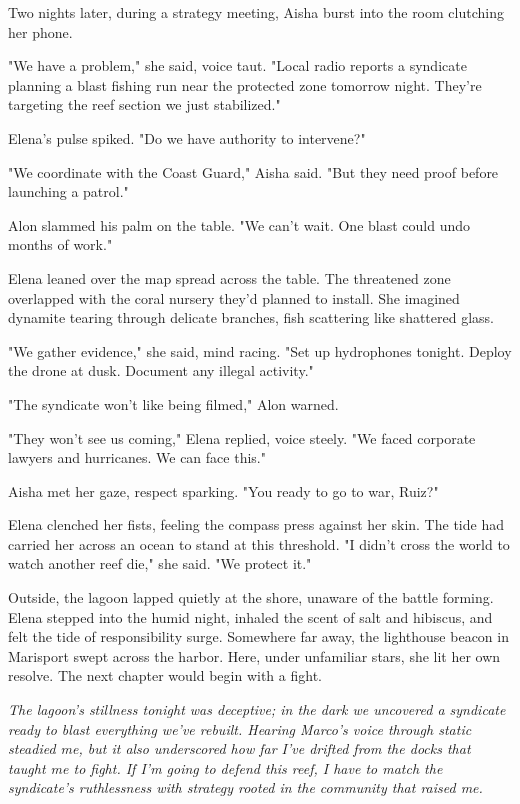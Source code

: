 \bigskip

Two nights later, during a strategy meeting, Aisha burst into the room clutching her phone.

"We have a problem," she said, voice taut. "Local radio reports a syndicate planning a blast fishing run near the protected zone tomorrow night. They're targeting the reef section we just stabilized."

Elena's pulse spiked. "Do we have authority to intervene?"

"We coordinate with the Coast Guard," Aisha said. "But they need proof before launching a patrol."

Alon slammed his palm on the table. "We can't wait. One blast could undo months of work."

Elena leaned over the map spread across the table. The threatened zone overlapped with the coral nursery they'd planned to install. She imagined dynamite tearing through delicate branches, fish scattering like shattered glass.

"We gather evidence," she said, mind racing. "Set up hydrophones tonight. Deploy the drone at dusk. Document any illegal activity."

"The syndicate won't like being filmed," Alon warned.

"They won't see us coming," Elena replied, voice steely. "We faced corporate lawyers and hurricanes. We can face this."

Aisha met her gaze, respect sparking. "You ready to go to war, Ruiz?"

Elena clenched her fists, feeling the compass press against her skin. The tide had carried her across an ocean to stand at this threshold. "I didn't cross the world to watch another reef die," she said. "We protect it."

Outside, the lagoon lapped quietly at the shore, unaware of the battle forming. Elena stepped into the humid night, inhaled the scent of salt and hibiscus, and felt the tide of responsibility surge. Somewhere far away, the lighthouse beacon in Marisport swept across the harbor. Here, under unfamiliar stars, she lit her own resolve. The next chapter would begin with a fight.

\noindent\textit{The lagoon's stillness tonight was deceptive; in the dark we uncovered a syndicate ready to blast everything we've rebuilt. Hearing Marco's voice through static steadied me, but it also underscored how far I've drifted from the docks that taught me to fight. If I'm going to defend this reef, I have to match the syndicate's ruthlessness with strategy rooted in the community that raised me.}
